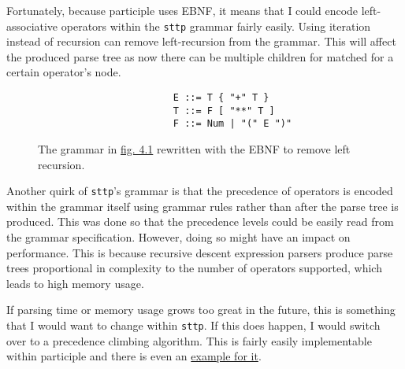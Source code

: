 Fortunately, because participle uses EBNF, it means that I could encode left-associative operators within the \verb|sttp| grammar fairly easily. Using iteration instead of recursion can remove left-recursion from the grammar\textsuperscript{\cite{pattis_2021}}. This will affect the produced parse tree as now there can be multiple children for matched for a certain operator's node.

\begin{figure}[H]
    \begin{center}
        \begin{verbatim}
                        E ::= T { "+" T }
                        T ::= F [ "**" T ]
                        F ::= Num | "(" E ")"
        \end{verbatim}
    \end{center}
    \vspace{-1.5em}
    \caption{\label{fig:4.2}The grammar in \hyperref[fig:4.1]{fig. 4.1} rewritten with the EBNF to remove left recursion.}
\end{figure}

Another quirk of \verb|sttp|'s grammar is that the precedence of operators is encoded within the grammar itself using grammar rules rather than after the parse tree is produced. This was done so that the precedence levels could be easily read from the grammar specification. However, doing so might have an impact on performance. This is because recursive descent expression parsers produce parse trees proportional in complexity to the number of operators supported, which leads to high memory usage\textsuperscript{\cite{bendersky_2012}}.

If parsing time or memory usage grows too great in the future, this is something that I would want to change within \verb|sttp|. If this does happen, I would switch over to a precedence climbing algorithm\textsuperscript{\cite{chu_2017}}. This is fairly easily implementable within participle and there is even an \href{https://github.com/alecthomas/participle/blob/master/_examples/precedenceclimbing/main.go}{example for it}.
